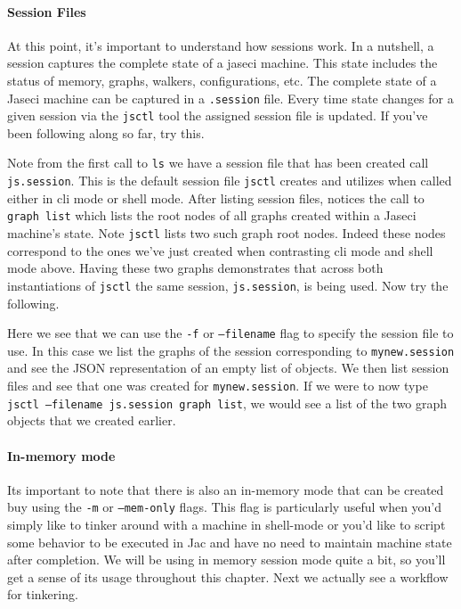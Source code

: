 \paragraph{Session Files}
At this point, it's important to understand how sessions work. In a nutshell, a session captures the complete state of a jaseci machine. This state includes the status of memory, graphs, walkers, configurations, etc. The complete state of a Jaseci machine can be captured in a \texttt{.session} file. Every time state changes for a given session via the \texttt{jsctl} tool the assigned session file is updated. If you've been following along so far, try this.
\par
{}
\par
Note from the first call to \texttt{ls} we have a session file that has been created call \texttt{js.session}. This is the default session file \texttt{jsctl} creates and utilizes when called either in cli mode or shell mode. After listing session files, notices the call to \texttt{graph list} which lists the root nodes of all graphs created within a Jaseci machine's state. Note \texttt{jsctl} lists two such graph root nodes. Indeed these nodes correspond to the ones we've just created when contrasting cli mode and shell mode above. Having these two graphs demonstrates that across both instantiations of \texttt{jsctl} the same session, \texttt{js.session}, is being used. Now try the following.
\par
{}
\par
Here we see that we can use the \texttt{-f} or \texttt{--filename} flag to specify the session file to use. In this case we list the graphs of the session corresponding to \texttt{mynew.session} and see the JSON representation of an empty list of objects. We then list session files and see that one was created for \texttt{mynew.session}. If we were to now type \texttt{jsctl --filename js.session graph list}, we would see a list of the two graph objects that we created earlier.
\paragraph{In-memory mode}
Its important to note that there is also an in-memory mode that can be created buy using the \texttt{-m} or \texttt{--mem-only} flags. This flag is particularly useful when you'd simply like to tinker around with a machine in shell-mode or you'd like to script some behavior to be executed in Jac and have no need to maintain machine state after completion. We will be using in memory session mode quite a bit, so you'll get a sense of its usage throughout this chapter. Next we actually see a workflow for tinkering.

